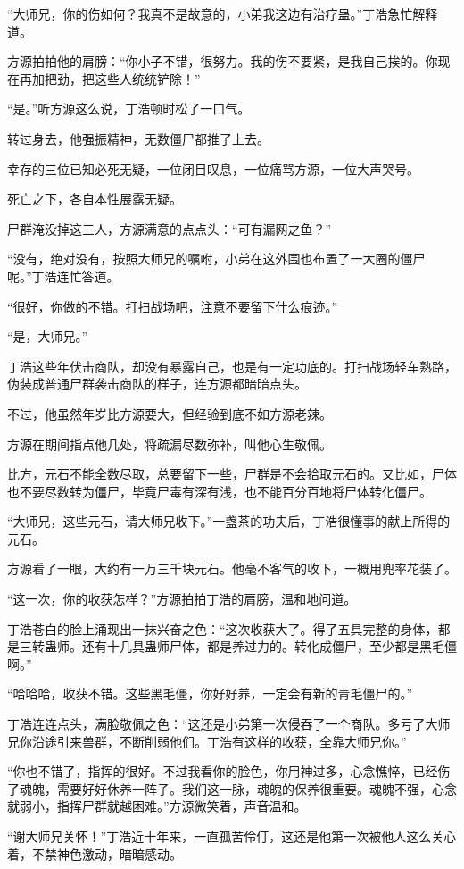 \begin{this_body}
“大师兄，你的伤如何？我真不是故意的，小弟我这边有治疗蛊。”丁浩急忙解释道。

方源拍拍他的肩膀：“你小子不错，很努力。我的伤不要紧，是我自己挨的。你现在再加把劲，把这些人统统铲除！”

“是。”听方源这么说，丁浩顿时松了一口气。

转过身去，他强振精神，无数僵尸都推了上去。

幸存的三位已知必死无疑，一位闭目叹息，一位痛骂方源，一位大声哭号。

死亡之下，各自本性展露无疑。

尸群淹没掉这三人，方源满意的点点头：“可有漏网之鱼？”

“没有，绝对没有，按照大师兄的嘱咐，小弟在这外围也布置了一大圈的僵尸呢。”丁浩连忙答道。

“很好，你做的不错。打扫战场吧，注意不要留下什么痕迹。”

“是，大师兄。”

丁浩这些年伏击商队，却没有暴露自己，也是有一定功底的。打扫战场轻车熟路，伪装成普通尸群袭击商队的样子，连方源都暗暗点头。

不过，他虽然年岁比方源要大，但经验到底不如方源老辣。

方源在期间指点他几处，将疏漏尽数弥补，叫他心生敬佩。

比方，元石不能全数尽取，总要留下一些，尸群是不会拾取元石的。又比如，尸体也不要尽数转为僵尸，毕竟尸毒有深有浅，也不能百分百地将尸体转化僵尸。

“大师兄，这些元石，请大师兄收下。”一盏茶的功夫后，丁浩很懂事的献上所得的元石。

方源看了一眼，大约有一万三千块元石。他毫不客气的收下，一概用兜率花装了。

“这一次，你的收获怎样？”方源拍拍丁浩的肩膀，温和地问道。

丁浩苍白的脸上涌现出一抹兴奋之色：“这次收获大了。得了五具完整的身体，都是三转蛊师。还有十几具蛊师尸体，都是养过力的。转化成僵尸，至少都是黑毛僵啊。”

“哈哈哈，收获不错。这些黑毛僵，你好好养，一定会有新的青毛僵尸的。”

丁浩连连点头，满脸敬佩之色：“这还是小弟第一次侵吞了一个商队。多亏了大师兄你沿途引来兽群，不断削弱他们。丁浩有这样的收获，全靠大师兄你。”

“你也不错了，指挥的很好。不过我看你的脸色，你用神过多，心念憔悴，已经伤了魂魄，需要好好休养一阵子。我们这一脉，魂魄的保养很重要。魂魄不强，心念就弱小，指挥尸群就越困难。”方源微笑着，声音温和。

“谢大师兄关怀！”丁浩近十年来，一直孤苦伶仃，这还是他第一次被他人这么关心着，不禁神色激动，暗暗感动。


\end{this_body}
